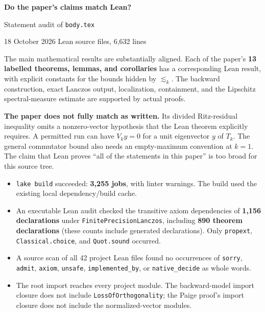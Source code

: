 \documentclass[10pt,a4paper]{article}
\newcommand{\code}[1]{{\small\nolinkurl{#1}}}
\newcommand{\head}[1]{\vspace{4pt}{\Large\bfseries\color{ink}#1}\par\vspace{3pt}}
\newcommand{\subhead}[1]{\vspace{3pt}{\bfseries\color{accent}#1}\par}
\begin{document}
{\huge\bfseries\color{ink}Do the paper's claims match Lean?}\par
{\large Statement audit of \code{body.tex}}\par
18 October 2026\quad\textbullet{} Lean source files, 6,632 lines

\head{Verdict}
The main mathematical results are substantially aligned. Each of the paper's
\textbf{13 labelled theorems, lemmas, and corollaries} has a corresponding Lean
result, with explicit constants for the bounds hidden by $\lesssim_k$.
The backward construction, exact Lanczos output, localization, containment,
and the Lipschitz spectral-measure estimate are supported by actual proofs.

\textbf{The paper does not fully match as written.} Its divided Ritz-residual
inequality omits a nonzero-vector hypothesis that the Lean theorem explicitly
requires. A permitted run can have $V_k y=0$ for a unit eigenvector $y$ of $T_k$.
The general commutator bound also needs an empty-maximum convention at $k=1$.
The claim that Lean proves ``all of the statements in this paper'' is too broad
for this source tree.

\subhead{Verification evidence}
\begin{itemize}
\item \texttt{lake build} succeeded: \textbf{3,255 jobs}, with linter warnings.
The build used the existing local dependency/build cache.
\item An executable Lean audit checked the transitive axiom dependencies of
\textbf{1,156 declarations} under \code{FinitePrecisionLanczos}, including
\textbf{890 theorem declarations} (these counts include generated declarations).
Only \code{propext}, \code{Classical.choice}, and \code{Quot.sound} occurred.
\item A source scan of all 42 project Lean files found no occurrences of
\code{sorry}, \code{admit}, \code{axiom}, \code{unsafe},
\code{implemented_by}, or \code{native_decide} as whole words.
\item The root import reaches every project module. The backward-model import
closure does not include \code{LossOfOrthogonality}; the Paige proof's import
closure does not include the normalized-vector modules.
\end{itemize}
\end{document}
